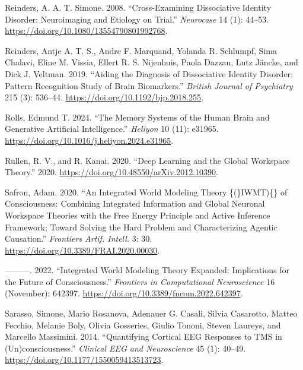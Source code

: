 \documentclass[
  a4paper]{article}
\newlength{\cslhangindent}
\newenvironment{CSLReferences}[2] %
 {\begin{list}{}{%
  \setlength{\itemindent}{0pt}
  \setlength{\leftmargin}{0pt}
  \setlength{\parsep}{0pt}
  \ifodd #1
   \setlength{\leftmargin}{\cslhangindent}
   \setlength{\itemindent}{-1\cslhangindent}
  \fi
  \setlength{\itemsep}{#2\baselineskip}}}
 {\end{list}}
\begin{document}
\begin{CSLReferences}{1}{0}
Reinders, A. A. T. Simone. 2008. {``Cross-Examining Dissociative
Identity Disorder: Neuroimaging and Etiology on Trial.''}
\emph{Neurocase} 14 (1): 44--53.
\url{https://doi.org/10.1080/13554790801992768}.

Reinders, Antje A. T. S., Andre F. Marquand, Yolanda R. Schlumpf, Sima
Chalavi, Eline M. Vissia, Ellert R. S. Nijenhuis, Paola Dazzan, Lutz
Jäncke, and Dick J. Veltman. 2019. {``Aiding the Diagnosis of
Dissociative Identity Disorder: Pattern Recognition Study of Brain
Biomarkers.''} \emph{British Journal of Psychiatry} 215 (3): 536--44.
\url{https://doi.org/10.1192/bjp.2018.255}.

Rolls, Edmund T. 2024. {``The Memory Systems of the Human Brain and
Generative Artificial Intelligence.''} \emph{Heliyon} 10 (11): e31965.
\url{https://doi.org/10.1016/j.heliyon.2024.e31965}.

Rullen, R. V., and R. Kanai. 2020. {``Deep Learning and the Global
Workspace Theory.''} 2020.
\url{https://doi.org/10.48550/arXiv.2012.10390}.

Safron, Adam. 2020. {``An Integrated World Modeling Theory
\{(\vphantom\}{IWMT})\vphantom\{\} of Consciousness: Combining
Integrated Information and Global Neuronal Workspace Theories with the
Free Energy Principle and Active Inference Framework; Toward Solving the
Hard Problem and Characterizing Agentic Causation.''} \emph{Frontiers
Artif. Intell.} 3: 30. \url{https://doi.org/10.3389/FRAI.2020.00030}.

---------. 2022. {``Integrated World Modeling Theory Expanded:
Implications for the Future of Consciousness.''} \emph{Frontiers in
Computational Neuroscience} 16 (November): 642397.
\url{https://doi.org/10.3389/fncom.2022.642397}.

Sarasso, Simone, Mario Rosanova, Adenauer G. Casali, Silvia Casarotto,
Matteo Fecchio, Melanie Boly, Olivia Gosseries, Giulio Tononi, Steven
Laureys, and Marcello Massimini. 2014. {``Quantifying Cortical {EEG}
Responses to {TMS} in (Un)consciousness.''} \emph{Clinical EEG and
Neuroscience} 45 (1): 40--49.
\url{https://doi.org/10.1177/1550059413513723}.


\end{CSLReferences}
\end{document}
